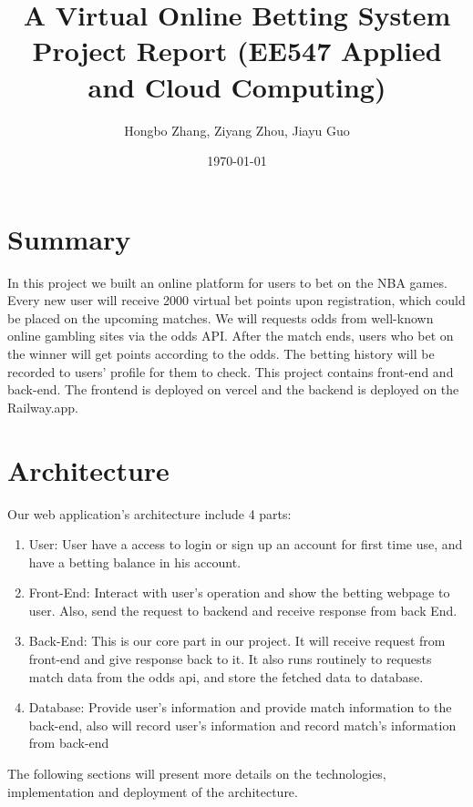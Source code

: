 \documentclass[singlecolumn]{article}
\begin{document}
\title{A Virtual Online Betting System\\
\large Project Report (EE547 Applied and Cloud Computing)}
\author{Hongbo Zhang, Ziyang Zhou, Jiayu Guo}
\date{\today}
\maketitle


\section{Summary}

In this project we built an online platform for users to bet on the NBA games. Every new user will receive 2000 virtual bet points upon registration, which could be placed on the upcoming matches. We will requests odds from well-known online gambling sites via the odds API. After the match ends, users who bet on the winner will get points according to the odds. The betting history will be recorded to users’ profile for them to check. This project contains front-end and back-end. The frontend is deployed on vercel and the backend is deployed on the Railway.app.


\section{Architecture}

Our web application's architecture include 4 parts:
\begin{enumerate}
    \item User: User have a access to login or sign up an account for first time use, and have a betting balance in his account.
    \item Front-End: Interact with user's operation and show the betting webpage to user. Also, send the request to backend and receive response from back End.
    \item Back-End: This is our core part in our project. It will receive request from front-end and give response back to it. It also runs routinely to requests match data from the odds api, and store the fetched data to database.
    \item Database: Provide user's information and provide match information to the back-end, also will record user's information and record match's information from back-end
\end{enumerate}

The following sections will present more details on the technologies, implementation and deployment of the architecture.
\end{document}
